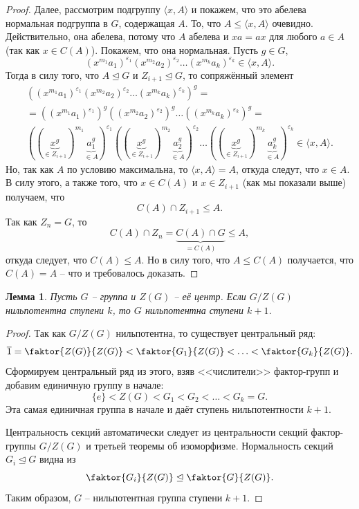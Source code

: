 \documentclass{article}
\newtheorem{lemma}{Лемма}[section]
\begin{document}
\begin{proof}
    Далее, рассмотрим подгруппу $\langle x, A \rangle$ и покажем, что это абелева нормальная подгруппа в $G$, содержащая $A$. То, что $A \leqslant \langle x, A \rangle$ очевидно.
    Действительно, она абелева, потому что $A$ абелева и $xa = ax$ для любого $a \in A$ (так как $x \in C(A)$).
    Покажем, что она нормальная. Пусть $g \in G$,
    \[
        (x^{m_1}a_1)^{\varepsilon_1} (x^{m_2}a_2)^{\varepsilon_2} \ldots (x^{m_k}a_k)^{\varepsilon_k} \in \langle x, A \rangle.
    \]
    Тогда в силу того, что $A \trianglelefteq G$ и $Z_{i + 1} \trianglelefteq G$, то сопряжённый элемент
    \begin{gather*}
        \left( (x^{m_1}a_1)^{\varepsilon_1} (x^{m_2}a_2)^{\varepsilon_2} \ldots (x^{m_k}a_k)^{\varepsilon_k} \right)^g = \\
        = ((x^{m_1}a_1)^{\varepsilon_1})^g ((x^{m_2}a_2)^{\varepsilon_2})^g \ldots ((x^{m_k}a_k)^{\varepsilon_k})^g = \\
        ((\underbrace{x^g}_{\in Z_{i + 1}})^{m_1}\underbrace{a_1^g}_{\in A})^{\varepsilon_1} ((\underbrace{x^g}_{\in Z_{i + 1}})^{m_2}\underbrace{a_2^g}_{\in A})^{\varepsilon_2} \ldots ((\underbrace{x^g}_{\in Z_{i + 1}})^{m_k} \underbrace{a_k^g}_{\in A})^{\varepsilon_k} \in \langle x, A \rangle.
    \end{gather*}
    Но, так как $A$ по условию максимальна, то $\langle x, A \rangle = A$, откуда следут, что $x \in A$.
    В силу этого, а также того, что $x \in C(A)$ и $x \in Z_{i + 1}$ (как мы показали выше) получаем, что
    \[
        C(A) \cap Z_{i + 1} \leqslant A.
    \]
    Так как $Z_n = G$, то $$ C(A) \cap Z_n = \underbrace{C(A) \cap G}_{=C(A)} \leqslant A, $$
    откуда следует, что $C(A) \leqslant A$. Но в силу того, что $A \leqslant C(A)$ получается, что $C(A) = A$ -- что и требовалось доказать.
\end{proof}

\begin{lemma} \label{dasfgasd}
    Пусть $G$ -- группа и $Z(G)$ -- её центр. Если $G / Z(G)$ нильпотентна ступени $k$, то $G$ нильпотентна ступени $k + 1$.
\end{lemma}
\begin{proof}
    Так как $G / Z(G)$ нильпотентна, то существует центральный ряд:
    \[
        \overline{1} = \faktor{Z(G)}{Z(G)} < \faktor{G_1}{Z(G)} < \ldots < \faktor{G_k}{Z(G)}.
    \]
    Сформируем центральный ряд из этого, взяв <<числители>> фактор-групп и добавим единичную группу в начале:
    \[
        \{ e \} < Z(G) < G_1 < G_2 < \ldots < G_k = G.
    \]
    Эта самая единичная группа в начале и даёт ступень нильпотентности $k + 1$.
    
    Центральность секций автоматически следует из центральности секций фактор-группы $G / Z(G)$ и третьей теоремы об изоморфизме. Нормальность секций $G_i \trianglelefteq G$ видна из
    \[
        \faktor{G_i}{Z(G)} \trianglelefteq \faktor{G}{Z(G)}.
    \]
    Таким образом, $G$ -- нильпотентная группа ступени $k + 1$.
\end{proof}
\end{document}
